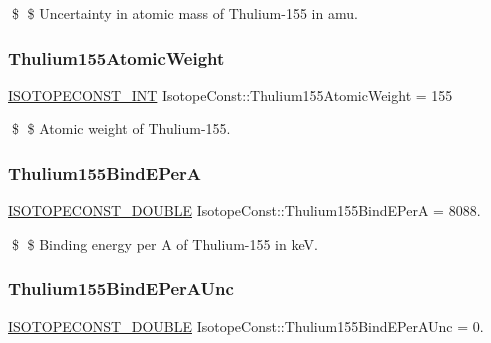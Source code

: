 \$ \$ Uncertainty in atomic mass of Thulium-\/155 in amu. \mbox{\label{group___isotope_const-_thulium-_tm155_ga81a98372e4bfd58c2d35619394049124}} 
\subsubsection{\texorpdfstring{Thulium155\+Atomic\+Weight}{Thulium155AtomicWeight}}
{\footnotesize\ttfamily \mbox{\hyperlink{group___isotope_const-_macros_ga5f18360b3e99483a35c32d789e62621c}{I\+S\+O\+T\+O\+P\+E\+C\+O\+N\+S\+T\+\_\+\+I\+NT}} Isotope\+Const\+::\+Thulium155\+Atomic\+Weight = 155}

\$ \$ Atomic weight of Thulium-\/155. \mbox{\label{group___isotope_const-_thulium-_tm155_ga672b49926b127907a6a4b046da3edc80}} 
\subsubsection{\texorpdfstring{Thulium155\+Bind\+E\+PerA}{Thulium155BindEPerA}}
{\footnotesize\ttfamily \mbox{\hyperlink{group___isotope_const-_macros_ga8f45a7272ce02c0b4c65c44636ed719a}{I\+S\+O\+T\+O\+P\+E\+C\+O\+N\+S\+T\+\_\+\+D\+O\+U\+B\+LE}} Isotope\+Const\+::\+Thulium155\+Bind\+E\+PerA = 8088.}

\$ \$ Binding energy per A of Thulium-\/155 in keV. \mbox{\label{group___isotope_const-_thulium-_tm155_ga154083bf45f85b866bf9e30e43d061d2}} 
\subsubsection{\texorpdfstring{Thulium155\+Bind\+E\+Per\+A\+Unc}{Thulium155BindEPerAUnc}}
{\footnotesize\ttfamily \mbox{\hyperlink{group___isotope_const-_macros_ga8f45a7272ce02c0b4c65c44636ed719a}{I\+S\+O\+T\+O\+P\+E\+C\+O\+N\+S\+T\+\_\+\+D\+O\+U\+B\+LE}} Isotope\+Const\+::\+Thulium155\+Bind\+E\+Per\+A\+Unc = 0.}

